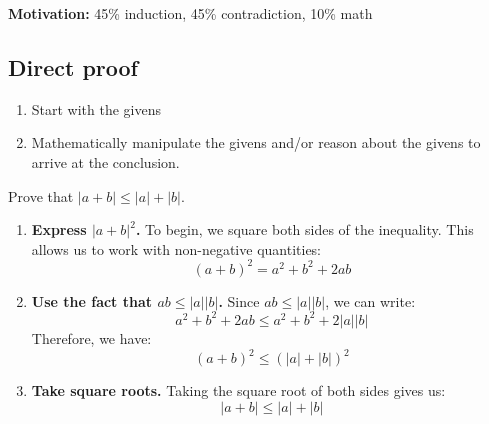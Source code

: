 \textbf{Motivation:} 45\% induction, 45\% contradiction, 10\% math

\subsection{Direct proof}
\begin{process}
    \begin{enumerate}
        \item Start with the givens
        \item Mathematically manipulate the givens and/or reason about the givens to arrive at the conclusion.
    \end{enumerate}
\end{process}

\begin{example}
    Prove that \( |a + b| \leq |a| + |b| \).
    
    \begin{enumerate}
    
        \item \textbf{Express \( |a + b|^2 \).}
        To begin, we square both sides of the inequality. This allows us to work with non-negative quantities:
        \[
        (a + b)^2 = a^2 + b^2 + 2ab
        \]
        
        \item \textbf{Use the fact that \( ab \leq |a||b| \).}
        Since \( ab \leq |a||b| \), we can write:
        \[
        a^2 + b^2 + 2ab \leq a^2 + b^2 + 2|a||b|
        \]
        Therefore, we have:
        \[
        (a + b)^2 \leq (|a| + |b|)^2
        \]
        
        \item \textbf{Take square roots.}
        Taking the square root of both sides gives us:
        \[
        |a + b| \leq |a| + |b|
        \]
        
    \end{enumerate}
\end{example}

